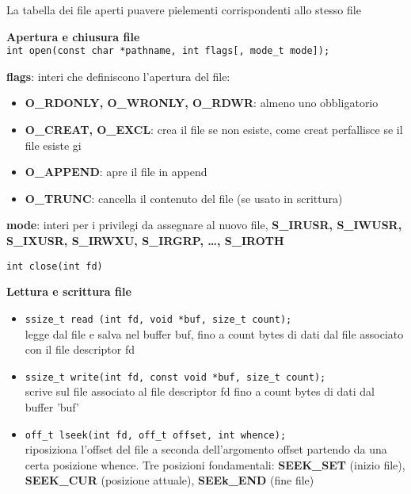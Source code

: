 \begin{flushleft}
\begin{itemize}
\begin{itemize}
\begin{itemize}
                      \end{itemize}
                    La tabella dei file aperti pu\aco avere pi\acu elementi corrispondenti allo stesso file
            \end{itemize} 
          \textbf{Apertura e chiusura file} \\
          \texttt{int open(const char *pathname, int flags[, mode\_t mode]);}\par 
          \textbf{flags}: interi che definiscono l'apertura del file:
          \begin{itemize}
            \item \textbf{O\_RDONLY, O\_WRONLY, O\_RDWR}: almeno uno \ace obbligatorio
            \item \textbf{O\_CREAT, O\_EXCL}: crea il file se non esiste, come creat per\aco fallisce se il file esiste gi\aca
            \item \textbf{O\_APPEND}: apre il file in append
            \item \textbf{O\_TRUNC}: cancella il contenuto del file (se usato in scrittura)
          \end{itemize}
          \textbf{mode}: interi per i privilegi da assegnare al nuovo file, \textbf{ S\_IRUSR, S\_IWUSR, S\_IXUSR, S\_IRWXU, S\_IRGRP, …, S\_IROTH}\par 
          \texttt{int close(int fd)}\par 
          \textbf{Lettura e scrittura file}\\
          \begin{itemize}
            \item \texttt{ssize\_t read (int fd, void *buf, size\_t count);}\\ legge dal file e salva nel buffer buf, 
                  fino a count bytes di dati dal file associato con il file descriptor fd
            \item \texttt{ssize\_t write(int fd, const void *buf, size\_t count);}\\ scrive sul file associato al file descriptor fd fino a count bytes di dati 
                  dal buffer 'buf'
            \item \texttt{off\_t lseek(int fd, off\_t offset, int whence);}\\ riposiziona l'offset del file a seconda dell'argomento 
                    offset partendo da una certa posizione whence. Tre posizioni fondamentali: \textbf{SEEK\_SET} (inizio file), \textbf{SEEK\_CUR} (posizione attuale), 
                    \textbf{SEEk\_END} (fine file)

\end{itemize}
\end{itemize}
\end{flushleft}
